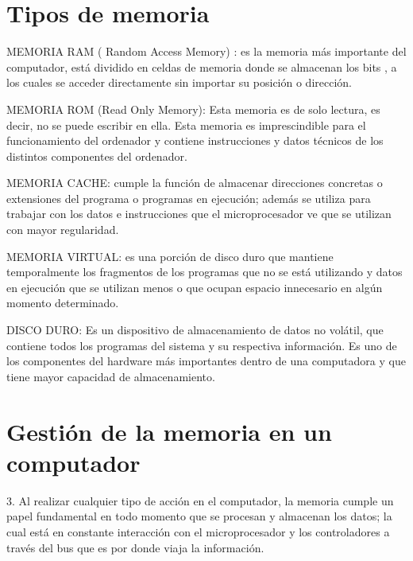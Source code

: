 \documentclass{article}
\begin{document}
\section{Tipos de memoria } \label{contenido}
MEMORIA RAM ( Random Access Memory) : es la memoria más importante del computador, está dividido en celdas de memoria donde se almacenan los bits , a los cuales  se acceder directamente sin importar su posición o dirección.\cite{tecdwebsite}
	
\vspace{0.5cm}
MEMORIA ROM (Read Only Memory): Esta memoria es de solo lectura, es decir, no se puede escribir en ella. Esta memoria es imprescindible para el funcionamiento del ordenador y contiene instrucciones y datos técnicos de los distintos componentes del ordenador.\cite{gestionwebsite}
    
\vspace{0.5cm}

MEMORIA CACHE: cumple la función de almacenar direcciones concretas o extensiones del programa o programas en ejecución; además se utiliza para trabajar con los datos e instrucciones que el microprocesador ve que se utilizan con mayor regularidad.

\vspace{0.5cm}

MEMORIA VIRTUAL: es una porción de disco duro que mantiene temporalmente los fragmentos de los programas que no se está utilizando y datos en ejecución que se utilizan menos o que ocupan espacio innecesario en algún momento determinado.

\vspace{0.5cm}

DISCO DURO: Es un dispositivo de almacenamiento de datos no volátil, que contiene todos los programas del sistema y su respectiva información. Es uno de los componentes del hardware más importantes dentro de una computadora y que tiene mayor capacidad de almacenamiento.

\vspace{0.5cm}

\section{Gestión de la memoria en un computador} \label{contenido}

3.	Al realizar cualquier tipo de acción en el computador, la memoria cumple un papel fundamental en todo momento que se procesan y almacenan los datos; la cual está en constante interacción con el microprocesador y los controladores a través del bus que es por donde viaja la información.
\end{document}

